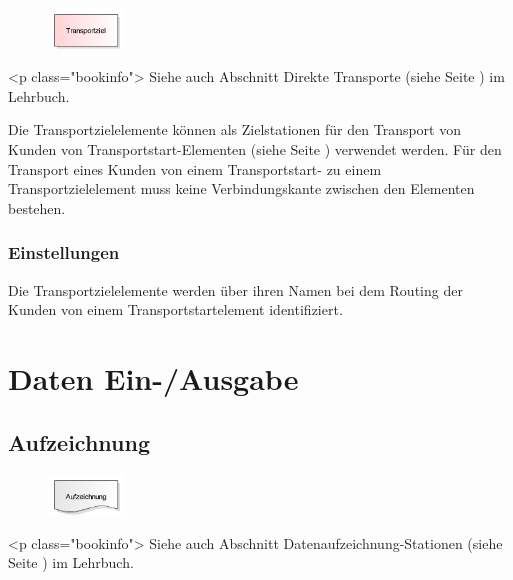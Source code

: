 \begin{figure}
\vspace{-22pt}
\includegraphics[width=2cm]{imageModelElementTransportDestination.png}
\vspace{-22pt}
\end{figure}

<p class="bookinfo">
Siehe auch Abschnitt Direkte Transporte (siehe Seite \pageref{ref:book:8.3.1}) im Lehrbuch.

Die Transportzielelemente können als Zielstationen für den Transport von Kunden von
Transportstart-Elementen (siehe Seite \pageref{ref:ModelElementTransportSource}) verwendet werden.
Für den Transport eines Kunden von einem Transportstart- zu einem Transportzielelement
muss keine Verbindungskante zwischen den Elementen bestehen.

\subsection*{Einstellungen}

Die Transportzielelemente werden über ihren Namen bei dem Routing der Kunden von
einem Transportstartelement identifiziert.





\chapter{Daten Ein-/Ausgabe}

\section{Aufzeichnung}
\label{ref:ModelElementRecord}

\begin{figure}
\vspace{-22pt}
\includegraphics[width=2cm]{imageModelElementRecord.png}
\vspace{-22pt}
\end{figure}

<p class="bookinfo">
Siehe auch Abschnitt Datenaufzeichnung-Stationen (siehe Seite \pageref{ref:book:9.3.4}) im Lehrbuch.


